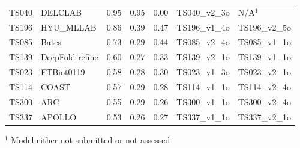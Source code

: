 \begin{table}[ht]
{\begin{tabular}{llrrrll}
TS040 & DELCLAB & 0.95 & 0.95 & 0.00 & TS040\_v2\_3o & N/A$^{1}$ \\ 
TS196 & HYU\_MLLAB & 0.86 & 0.39 & 0.47 & TS196\_v1\_4o & TS196\_v2\_5o \\ 
TS085 & Bates & 0.73 & 0.29 & 0.44 & TS085\_v2\_4o & TS085\_v1\_1o \\ 
TS139 & DeepFold-refine & 0.60 & 0.27 & 0.33 & TS139\_v2\_1o & TS139\_v1\_1o \\ 
TS023 & FTBiot0119 & 0.58 & 0.28 & 0.30 & TS023\_v1\_3o & TS023\_v2\_1o \\ 
TS114 & COAST & 0.57 & 0.29 & 0.28 & TS114\_v1\_1o & TS114\_v2\_4o \\ 
TS300 & ARC & 0.55 & 0.29 & 0.26 & TS300\_v1\_1o & TS300\_v2\_4o \\ 
TS337 & APOLLO & 0.53 & 0.26 & 0.27 & TS337\_v1\_1o & TS337\_v2\_1o \\ 
\bottomrule
\end{tabular}%
}
\begin{flushleft}\footnotesize $^{1}$ Model either not submitted or not assessed\end{flushleft}
\end{table}
